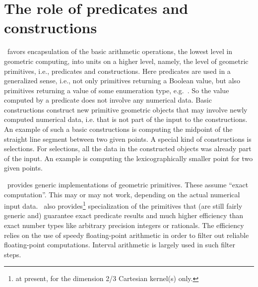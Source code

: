 

\section{The role of predicates and constructions}
\cgal\ favors encapsulation of the basic arithmetic operations, the lowest
level in geometric computing, into units on a higher level, namely,
the level of geometric primitives, i.e., predicates and constructions. 
Here predicates are used in a generalized sense, i.e., not only primitives 
returning a Boolean value, but also primitives returning a value of 
some enumeration type, e.g.\ . So the value computed
by a predicate does not involve any numerical data. Basic constructions 
construct new primitive geometric objects that may involve newly computed
numerical data, i.e. that is not part of the input to the constructions. 
An example of such a basic constructions is computing the midpoint of
the straight line segment between two given points.
A special kind of constructions is selections. For selections, all the data
in the constructed objects was already part of the input. An example is
computing the lexicographically smaller point for two given points.

\cgal\ provides generic implementations of geometric primitives. These assume
``exact computation''. This may or may not work, depending on the actual
numerical input data. \cgal\ also provides\footnote{at present, for the 
dimension 2/3 Cartesian kernel(s) only.}
specialization of the primitives
that (are still fairly generic and) guarantee exact predicate results and
much higher efficiency than exact number types like arbitrary precision
integers or rationals. The efficiency relies on the use of speedy 
floating-point arithmetic in order to filter out reliable floating-point 
computations. Interval arithmetic is largely used in such filter steps.

